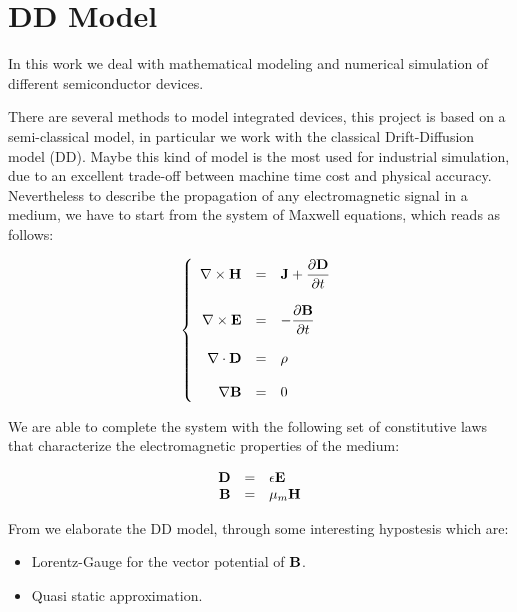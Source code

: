 \section{DD Model}
In this work we deal with mathematical modeling and numerical simulation of different semiconductor devices. 

There are several methods to model integrated devices, this project is based on a semi-classical model, in particular we work with the classical Drift-Diffusion model (DD). Maybe this kind of model is the most used for industrial simulation, due to an excellent trade-off between machine time cost and physical accuracy. Nevertheless to describe the propagation of any electromagnetic signal in a medium, we have to start from the system of Maxwell equations, which reads as follows:

\begin{equation}
\label{eq: Maxwell system}
\left\{
\begin{array}{rcl}
\nabla \times \mathbf{H} & = & \mathbf{J} + \dfrac{\partial \mathbf{D}}{\partial t} \\ \\
\nabla \times \mathbf{E} & = & - \dfrac{\partial \mathbf{B}}{\partial t} \\ \\
\nabla \cdot \mathbf{D} & = & \rho \\ \\
\nabla \mathbf{B} &  = & 0
\end{array}
\right.
\end{equation}

We are able to complete the system with the following set of constitutive laws that characterize the electromagnetic properties of the medium:

\begin{equation}
\begin{array}{rcl}
\mathbf{D} & = & \epsilon \mathbf{E} \\
\mathbf{B} & = & \mu_m \mathbf{H}
\end{array}
\end{equation}

From  we elaborate the DD model, through some interesting hypostesis which are:
\begin{itemize}
\item Lorentz-Gauge for the vector potential of $\mathbf{B}$.
\item Quasi static approximation.
\end{itemize}

